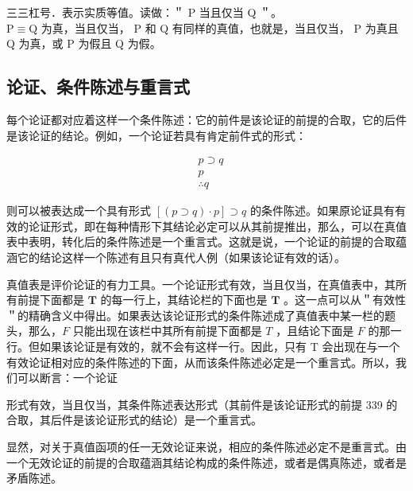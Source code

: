 三三杠号．表示实质等值。读做：＂ P 当且仅当 Q ＂。\\
$\mathrm{P} \equiv \mathrm{Q}$ 为真，当且仅当， P 和 Q 有同样的真值，也就是，当且仅当， P 为真且 Q 为真，或 P 为假且 Q 为假。

\subsection{论证、条件陈述与重言式}
每个论证都对应着这样一个条件陈述：它的前件是该论证的前提的合取，它的后件是该论证的结论。例如，一个论证若具有肯定前件式的形式：

$$
\begin{aligned}
& p \supset q \\
& p \\
& \therefore q
\end{aligned}
$$

则可以被表达成一个具有形式 $[(p \supset q) \cdot p] \supset q$ 的条件陈述。如果原论证具有有效的论证形式，即在每种情形下其结论必定可以从其前提推出，那么，可以在真值表中表明，转化后的条件陈述是一个重言式。这就是说，一个论证的前提的合取蕴涵它的结论这样一个陈述有且只有真代人例（如果该论证有效的话）。

真值表是评价论证的有力工具。一个论证形式有效，当且仅当，在真值表中，其所有前提下面都是 $\mathbf{T}$ 的每一行上，其结论栏的下面也是 $\mathbf{T}$ 。这一点可以从＂有效性＂的精确含义中得出。如果表达该论证形式的条件陈述成了真值表中某一栏的题头，那么，$F$ 只能出现在该栏中其所有前提下面都是 $T$ ，且结论下面是 $F$ 的那一行。但如果该论证是有效的，就不会有这样一行。因此，只有 T 会出现在与一个有效论证相对应的条件陈述的下面，从而该条件陈述必定是一个重言式。所以，我们可以断言：一个论证

形式有效，当且仅当，其条件陈述表达形式（其前件是该论证形式的前提 339 的合取，其后件是该论证形式的结论）是一个重言式。

显然，对关于真值函项的任一无效论证来说，相应的条件陈述必定不是重言式。由一个无效论证的前提的合取蕴涵其结论构成的条件陈述，或者是偶真陈述，或者是矛盾陈述。

